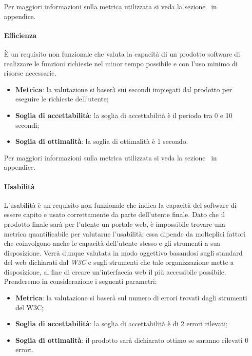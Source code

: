Per maggiori informazioni sulla metrica utilizzata si veda la sezione~ in appendice.

\paragraph{Efficienza}
È un requisito non funzionale che valuta la capacità di un prodotto software di realizzare le funzioni richieste nel minor tempo possibile e con l’uso minimo di risorse necessarie.
\begin{itemize}
	\item \textbf{Metrica}: la valutazione si baserà sui secondi impiegati dal prodotto per eseguire le richieste dell'utente;
	\item \textbf{Soglia di accettabilità}: la soglia di accettabilità è il periodo tra 0 e 10 secondi;
	\item \textbf{Soglia di ottimalità}: la soglia di ottimalità è 1 secondo.
\end{itemize}

Per maggiori informazioni sulla metrica utilizzata si veda la sezione~ in appendice.

\paragraph{Usabilità}
L'usabilità è un requisito non funzionale che indica la capacità del software di essere capito e usato correttamente da parte dell'utente finale. Dato che il prodotto finale sarà per l'utente un portale web, è impossibile trovare una metrica quantificabile per valutarne l'usabilità: essa dipende da molteplici fattori che coinvolgono anche le capacità dell'utente stesso e gli strumenti a sua disposizione. Verrà dunque valutata in modo oggettivo basandosi sugli standard del web dichiarati dal \emph{W3C} e sugli strumenti che tale organizzazione mette a disposizione, al fine di creare un'interfaccia web il più accessibile possibile.
Prenderemo in considerazione i seguenti parametri:
\begin{itemize}
	\item \textbf{Metrica}: la valutazione si baserà sul numero di errori trovati dagli strumenti del W3C;
	\item \textbf{Soglia di accettabilità}: la soglia di accettabilità è di 2 errori rilevati;
	\item \textbf{Soglia di ottimalità}: il prodotto sarà dichiarato ottimo se saranno rilevati 0 errori.
\end{itemize}

